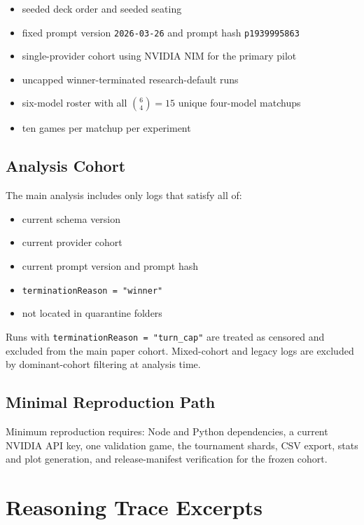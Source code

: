 \begin{itemize}[leftmargin=1.25em]
  \item seeded deck order and seeded seating
  \item fixed prompt version \texttt{2026-03-26} and prompt hash \texttt{p1939995863}
  \item single-provider cohort using NVIDIA NIM for the primary pilot
  \item uncapped winner-terminated research-default runs
  \item six-model roster with all $\binom{6}{4}=15$ unique four-model matchups
  \item ten games per matchup per experiment
\end{itemize}

\subsection{Analysis Cohort}

The main analysis includes only logs that satisfy all of:
\begin{itemize}[leftmargin=1.25em]
  \item current schema version
  \item current provider cohort
  \item current prompt version and prompt hash
  \item \texttt{terminationReason = "winner"}
  \item not located in quarantine folders
\end{itemize}

Runs with \texttt{terminationReason = "turn\_cap"} are treated as censored and excluded from the main paper cohort. Mixed-cohort and legacy logs are excluded by dominant-cohort filtering at analysis time.

\subsection{Minimal Reproduction Path}

Minimum reproduction requires: Node and Python dependencies, a current NVIDIA API key, one validation game, the tournament shards, CSV export, stats and plot generation, and release-manifest verification for the frozen cohort.

\section{Reasoning Trace Excerpts}
\label{app:reasoning-traces}

